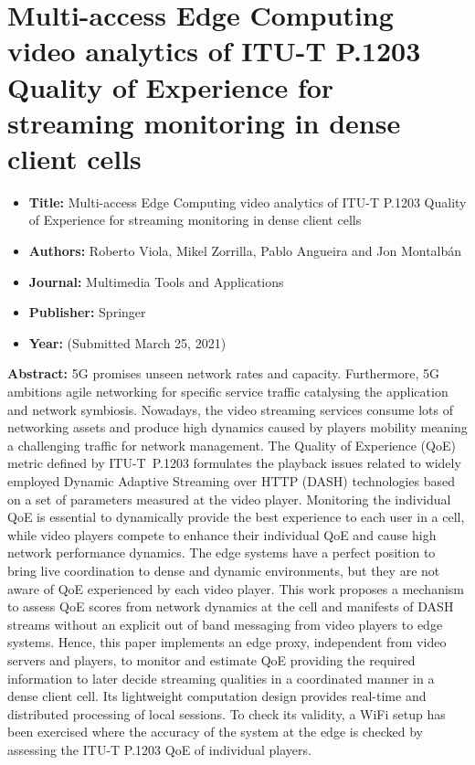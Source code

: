 

\section[Multi-access Edge Computing video analytics of ITU-T P.1203 Quality of Experience for streaming monitoring in dense client cells]{Multi-access Edge Computing video analytics of ITU-T P.1203 Quality of Experience for streaming monitoring in dense client cells}
\label{chap:MTAP2020}
\begin{itemize} \itemsep1pt\parskip0pt
	\item \textbf{Title:} Multi-access Edge Computing video analytics of ITU-T P.1203 Quality of Experience for streaming monitoring in dense client cells
	\item \textbf{Authors:} Roberto Viola, Mikel Zorrilla, Pablo Angueira and Jon Montalb\'an
	\item \textbf{Journal:} Multimedia Tools and Applications
	\item \textbf{Publisher:} Springer
	\item \textbf{Year:} (Submitted March 25, 2021)
\end{itemize}	

\textbf{Abstract:} 5G promises unseen network rates and capacity. Furthermore, 5G ambitions agile networking for specific service traffic catalysing the application and network symbiosis. Nowadays, the video streaming services consume lots of networking assets and produce high dynamics caused by players mobility meaning a challenging traffic for network management. The Quality of Experience (QoE) metric defined by \hbox{ITU-T P.1203} formulates the playback issues related to widely employed Dynamic Adaptive Streaming over HTTP (DASH) technologies based on a set of parameters measured at the video player. Monitoring the individual QoE is essential to dynamically provide the best experience to each user in a cell, while video players compete to enhance their individual QoE and cause high network performance dynamics. The edge systems have a perfect position to bring live coordination to dense and dynamic environments, but they are not aware of QoE experienced by each video player. This work proposes a mechanism to assess QoE scores from network dynamics at the cell and manifests of DASH streams without an explicit out of band messaging from video players to edge systems. Hence, this paper implements an edge proxy, independent from video servers and players, to monitor and estimate QoE providing the required information to later decide streaming qualities in a coordinated manner in a dense client cell. Its lightweight computation design provides real-time and distributed processing of local sessions. To check its validity, a WiFi setup has been exercised where the accuracy of the system at the edge is checked by assessing the ITU-T P.1203 QoE of individual players.

